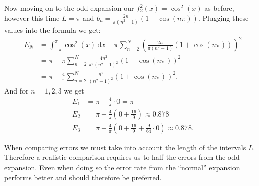 Now moving on to the odd expansion our $f_2^2(x) = \cos^2(x)$ as before, however this time $L = \pi$ and $b_n = \frac{2n}{\pi \left( n^2 - 1 \right)} \left( 1 + \cos \left( n\pi \right) \right)$. Plugging these values into the formula we get:
\begin{align*}
  E_N &= \int_{-\pi}^{\pi} \cos^2(x) \, \mathrm{d}x - \pi \sum_{n = 2}^{N} \left( \frac{2n}{\pi \left( n^2 - 1 \right)} \left( 1 + \cos \left( n \pi \right) \right) \right)^2 \\
  &= \pi - \pi \sum_{n = 2}^{N} \frac{4n^2}{\pi^2 \left( n^2 - 1 \right)^2} \left( 1 + \cos \left( n\pi \right) \right)^2 \\
  &= \pi - \frac{4}{\pi} \sum_{n = 2}^{N} \frac{n^2}{\left( n^2 - 1 \right)^2} \left( 1 + \cos(n \pi) \right)^2
.\end{align*}
And for $n = 1,2,3$ we get
\begin{align*}
  E_1 &= \pi - \frac{4}{\pi}\cdot 0 = \pi \\
  E_2 &= \pi - \frac{4}{\pi} \left( 0 + \frac{16}{9} \right) \approx \num{0,878}  \\
  E_3 &= \pi - \frac{4}{\pi } \left( 0 + \frac{16}{9} + \frac{9}{64} \cdot 0 \right) \approx \num{0,878} 
.\end{align*}

When comparing errors we must take into account the length of the intervals $L$. Therefore a realistic comparison requires us to half the errors from the odd expansion. Even when doing so the error rate from the ``normal'' expansion performs better and should therefore be preferred.

